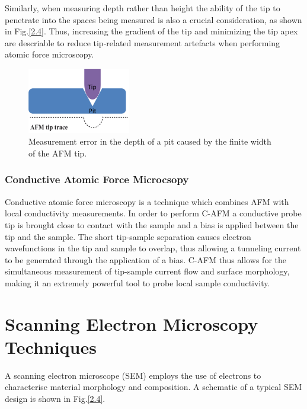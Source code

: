 Similarly, when measuring depth rather than height the ability of the tip to penetrate into the spaces being measured is also a crucial consideration, as shown in Fig.\ref{2.4}. Thus, increasing the gradient of the tip and minimizing the tip apex are descriable to reduce tip-related measurement artefacts when performing atomic force microscopy.

\begin{figure}[h]
	\centering
	\includegraphics[width=0.4\textwidth]{Figs/Ch2/afm3.png}
	\caption {Measurement error in the depth of a pit caused by the finite width of the AFM tip.}
\end{figure}
\FloatBarrier

\subsubsection{Conductive Atomic Force Microcsopy}

Conductive atomic force microscopy  is a technique which combines AFM with local conductivity measurements. In order to perform C-AFM a conductive probe tip is brought close to contact with the sample and a bias is applied between the tip and the sample. The short tip-sample separation causes electron wavefunctions in the tip and sample to overlap, thus allowing a tunneling current to be generated through the application of a bias. C-AFM thus allows for the simultaneous measurement of tip-sample current flow and surface morphology, making it an extremely powerful tool to probe local sample conductivity. 




\section{Scanning Electron Microscopy Techniques}

A scanning electron microscope   (SEM) employs the use of electrons to characterise material morphology and composition. A schematic of a typical SEM design is shown in Fig.\ref{2.4}.

